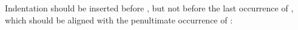 \documentclass{article}
\begin{document}
\begin{AgdaAlign}
\begin{code}%
\>[0]\AgdaSpace{}%
\AgdaSpace{}%
\<%
\end{code}

Indentation should be inserted before , but not
before the last occurrence of , which should be
aligned with the penultimate occurrence of :
\begin{code}%
\>[0][@{}l@{\AgdaIndent{1}}]%
\>[2]\<%
\\
\>[2][@{}l@{\AgdaIndent{0}}]%
\>[4]%
\>[7]\AgdaSymbol{:}\AgdaSpace{}%
\<%
\\
%
\>[4]%
\>[7]\AgdaSymbol{:}%
\>[3I]\AgdaSpace{}%
\<%
\\
\>[.]\<[3I]%
\>[9]\<%
\end{code}
\end{AgdaAlign}
\end{document}
